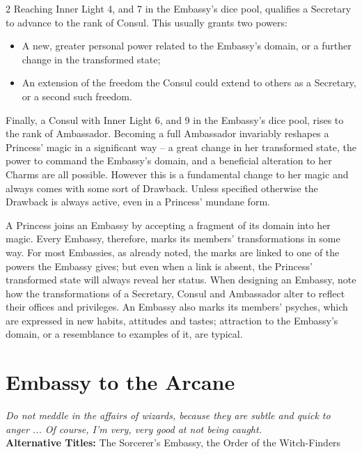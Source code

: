 \begin{multicols}{2}
Reaching Inner Light 4, and 7 in the Embassy's dice pool, qualifies a Secretary to advance to the rank of Consul. This usually grants two powers:

   \begin{itemize}
\item  A new, greater personal power related to the Embassy's domain, or a further change in the transformed state;
\item     An extension of the freedom the Consul could extend to others as a Secretary, or a second such freedom.    \end{itemize}


Finally, a Consul with Inner Light 6, and 9 in the Embassy's dice pool, rises to the rank of Ambassador. Becoming a full Ambassador invariably reshapes a Princess' magic in a significant way -- a great change in her transformed state, the power to command the Embassy's domain, and a beneficial alteration to her Charms are all possible. However this is a fundamental change to her magic and always comes with some sort of Drawback. Unless specified otherwise the Drawback is always active, even in a Princess' mundane form. 

A Princess joins an Embassy by accepting a fragment of its domain into her magic.  Every Embassy, therefore, marks its members' transformations in some way.  For most Embassies, as already noted, the marks are linked to one of the powers the Embassy gives; but even when a link is absent, the Princess' transformed state will always reveal her status.  When designing an Embassy, note how the transformations of a Secretary, Consul and Ambassador alter to reflect their offices and privileges.  An Embassy also marks its members' psyches, which are expressed in new habits, attitudes and tastes; attraction to the Embassy's domain, or a resemblance to examples of it, are typical. 

\section*{Embassy to the Arcane}
\label{sec:EmbassyArcane}

\textit{Do not meddle in the affairs of wizards, because they are subtle and quick to anger ... Of course, I'm very, very good at not being caught.}\\

\noindent \textbf{Alternative Titles:} The Sorcerer's Embassy, the Order of the Witch-Finders\\


\end{multicols}
